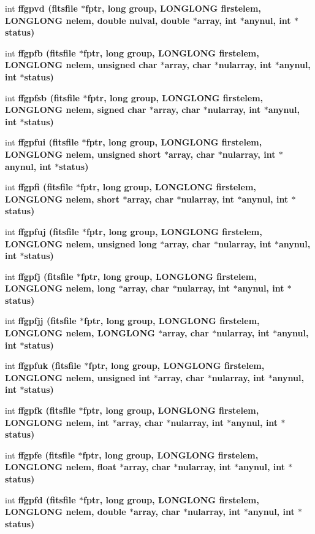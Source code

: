 \begin{CompactItemize}
\item 
int \bf{ffgpvd} (\bf{fitsfile} $\ast$fptr, long group, \bf{LONGLONG} firstelem, \bf{LONGLONG} nelem, double nulval, double $\ast$array, int $\ast$anynul, int $\ast$status)
\item 
int \bf{ffgpfb} (\bf{fitsfile} $\ast$fptr, long group, \bf{LONGLONG} firstelem, \bf{LONGLONG} nelem, unsigned char $\ast$array, char $\ast$nularray, int $\ast$anynul, int $\ast$status)
\item 
int \bf{ffgpfsb} (\bf{fitsfile} $\ast$fptr, long group, \bf{LONGLONG} firstelem, \bf{LONGLONG} nelem, signed char $\ast$array, char $\ast$nularray, int $\ast$anynul, int $\ast$status)
\item 
int \bf{ffgpfui} (\bf{fitsfile} $\ast$fptr, long group, \bf{LONGLONG} firstelem, \bf{LONGLONG} nelem, unsigned short $\ast$array, char $\ast$nularray, int $\ast$anynul, int $\ast$status)
\item 
int \bf{ffgpfi} (\bf{fitsfile} $\ast$fptr, long group, \bf{LONGLONG} firstelem, \bf{LONGLONG} nelem, short $\ast$array, char $\ast$nularray, int $\ast$anynul, int $\ast$status)
\item 
int \bf{ffgpfuj} (\bf{fitsfile} $\ast$fptr, long group, \bf{LONGLONG} firstelem, \bf{LONGLONG} nelem, unsigned long $\ast$array, char $\ast$nularray, int $\ast$anynul, int $\ast$status)
\item 
int \bf{ffgpfj} (\bf{fitsfile} $\ast$fptr, long group, \bf{LONGLONG} firstelem, \bf{LONGLONG} nelem, long $\ast$array, char $\ast$nularray, int $\ast$anynul, int $\ast$status)
\item 
int \bf{ffgpfjj} (\bf{fitsfile} $\ast$fptr, long group, \bf{LONGLONG} firstelem, \bf{LONGLONG} nelem, \bf{LONGLONG} $\ast$array, char $\ast$nularray, int $\ast$anynul, int $\ast$status)
\item 
int \bf{ffgpfuk} (\bf{fitsfile} $\ast$fptr, long group, \bf{LONGLONG} firstelem, \bf{LONGLONG} nelem, unsigned int $\ast$array, char $\ast$nularray, int $\ast$anynul, int $\ast$status)
\item 
int \bf{ffgpfk} (\bf{fitsfile} $\ast$fptr, long group, \bf{LONGLONG} firstelem, \bf{LONGLONG} nelem, int $\ast$array, char $\ast$nularray, int $\ast$anynul, int $\ast$status)
\item 
int \bf{ffgpfe} (\bf{fitsfile} $\ast$fptr, long group, \bf{LONGLONG} firstelem, \bf{LONGLONG} nelem, float $\ast$array, char $\ast$nularray, int $\ast$anynul, int $\ast$status)
\item 
int \bf{ffgpfd} (\bf{fitsfile} $\ast$fptr, long group, \bf{LONGLONG} firstelem, \bf{LONGLONG} nelem, double $\ast$array, char $\ast$nularray, int $\ast$anynul, int $\ast$status)

\end{CompactItemize}
